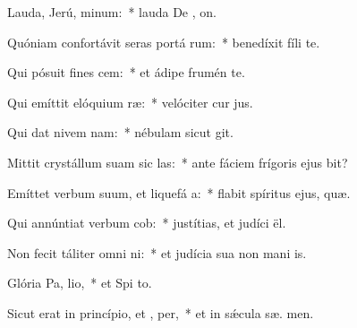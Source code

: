\item Lauda, Jerú, minum:~* lauda De , on.
\item Quóniam confortávit seras portá rum:~* benedíxit fíli   te.
\item Qui pósuit fines  cem:~* et ádipe frumén  te.
\item Qui emíttit elóquium  ræ:~* velóciter cur  jus.
\item Qui dat nivem  nam:~* nébulam sicut  git.
\item Mittit crystállum suam sic las:~* ante fáciem frígoris ejus  bit?
\item Emíttet verbum suum, et liquefá a:~* flabit spíritus ejus,   quæ.
\item Qui annúntiat verbum  cob:~* justítias, et judíci  ël.
\item Non fecit táliter omni ni:~* et judícia sua non mani is.
\item Glória Pa,  lio,~* et Spi to.
\item Sicut erat in princípio, et ,  per,~* et in sǽcula sæ. men.
